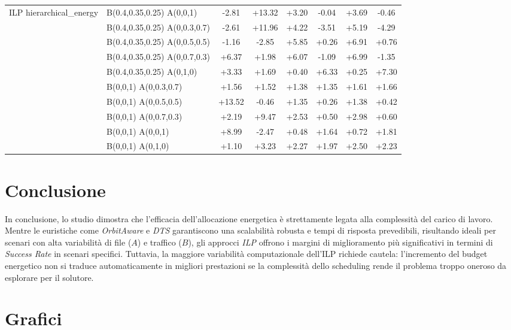 \documentclass[12pt]{article}
\begin{document}
\begin{table}[h]
\begin{tabular}{llcccccc}
\multirow{10}{*}{ILP hierarchical\_energy}
& B(0.4,0.35,0.25) A(0,0,1)     & -2.81 & +13.32 & +3.20 & -0.04 & +3.69 & -0.46 \\
& B(0.4,0.35,0.25) A(0,0.3,0.7) & -2.61 & +11.96 & +4.22 & -3.51 & +5.19 & -4.29 \\
& B(0.4,0.35,0.25) A(0,0.5,0.5) & -1.16 & -2.85 & +5.85 & +0.26 & +6.91 & +0.76 \\
& B(0.4,0.35,0.25) A(0,0.7,0.3) & +6.37 & +1.98 & +6.07 & -1.09 & +6.99 & -1.35 \\
& B(0.4,0.35,0.25) A(0,1,0)     & +3.33 & +1.69 & +0.40 & +6.33 & +0.25 & +7.30 \\
& B(0,0,1) A(0,0.3,0.7)         & +1.56 & +1.52 & +1.38 & +1.35 & +1.61 & +1.66 \\
& B(0,0,1) A(0,0.5,0.5)         & +13.52 & -0.46 & +1.35 & +0.26 & +1.38 & +0.42 \\
& B(0,0,1) A(0,0.7,0.3)         & +2.19 & +9.47 & +2.53 & +0.50 & +2.98 & +0.60 \\
& B(0,0,1) A(0,0,1)             & +8.99 & -2.47 & +0.48 & +1.64 & +0.72 & +1.81 \\
& B(0,0,1) A(0,1,0)             & +1.10 & +3.23 & +2.27 & +1.97 & +2.50 & +2.23 \\

\bottomrule
\end{tabular}
\end{table}
\FloatBarrier


\section{Conclusione}

In conclusione, lo studio dimostra che l'efficacia dell'allocazione energetica è strettamente legata alla complessità del carico di lavoro. Mentre le euristiche come \textit{OrbitAware} e \textit{DTS} garantiscono una scalabilità robusta e tempi di risposta prevedibili, risultando ideali per scenari con alta variabilità di file ($A$) e traffico ($B$), gli approcci \textit{ILP} offrono i margini di miglioramento più significativi in termini di \textit{Success Rate} in scenari specifici. Tuttavia, la maggiore variabilità computazionale dell'ILP richiede cautela: l'incremento del budget energetico non si traduce automaticamente in migliori prestazioni se la complessità dello scheduling rende il problema troppo oneroso da esplorare per il solutore.

\section{Grafici}
\end{document}
